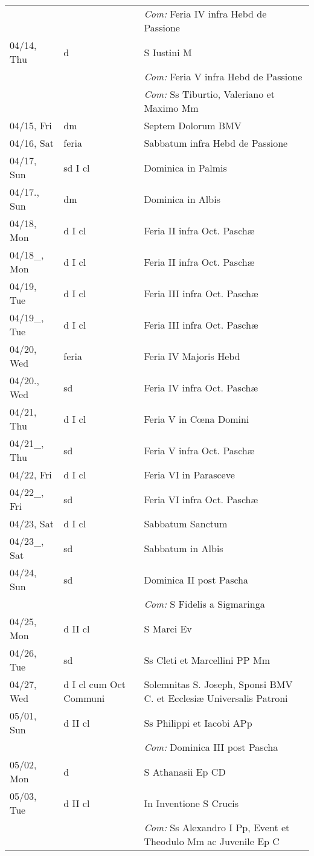 \documentclass[10pt]{article}
\begin{document}
\begin{longtable}{ l l l }
 & & \textit{Com:} Feria IV infra Hebd de Passione\\
04/14, Thu & d & S Iustini M\\
 & & \textit{Com:} Feria V infra Hebd de Passione\\
 & & \textit{Com:} Ss Tiburtio, Valeriano et Maximo Mm\\
04/15, Fri & dm & Septem Dolorum BMV\\
04/16, Sat & feria & Sabbatum infra Hebd de Passione\\
04/17, Sun & sd I cl & Dominica in Palmis\\
04/17., Sun & dm & Dominica in Albis\\
04/18, Mon & d I cl & Feria II infra Oct. Paschæ\\
04/18_, Mon & d I cl & Feria II infra Oct. Paschæ\\
04/19, Tue & d I cl & Feria III infra Oct. Paschæ\\
04/19_, Tue & d I cl & Feria III infra Oct. Paschæ\\
04/20, Wed & feria & Feria IV Majoris Hebd\\
04/20., Wed & sd & Feria IV infra Oct. Paschæ\\
04/21, Thu & d I cl & Feria V in Cœna Domini\\
04/21_, Thu & sd & Feria V infra Oct. Paschæ\\
04/22, Fri & d I cl & Feria VI in Parasceve\\
04/22_, Fri & sd & Feria VI infra Oct. Paschæ\\
04/23, Sat & d I cl & Sabbatum Sanctum\\
04/23_, Sat & sd & Sabbatum in Albis\\
04/24, Sun & sd & Dominica II post Pascha\\
 & & \textit{Com:} S Fidelis a Sigmaringa\\
04/25, Mon & d II cl & S Marci Ev\\
04/26, Tue & sd & Ss Cleti et Marcellini PP Mm\\
04/27, Wed & d I cl cum Oct Communi & Solemnitas S. Joseph, Sponsi BMV C. et Ecclesiæ Universalis Patroni\\
05/01, Sun & d II cl & Ss Philippi et Iacobi APp\\
 & & \textit{Com:} Dominica III post Pascha\\
05/02, Mon & d & S Athanasii Ep CD\\
05/03, Tue & d II cl & In Inventione S Crucis\\
 & & \textit{Com:} Ss Alexandro I Pp, Event et Theodulo Mm ac Juvenile Ep C\\

\end{longtable}
\end{document}
